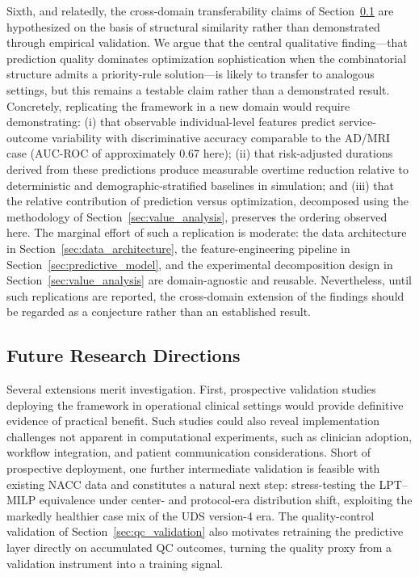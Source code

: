 \documentclass[11pt,a4paper]{article}
\newcommand{\rev}[1]{{\color{red}#1}}
\begin{document}
Sixth, and relatedly, the cross-domain transferability claims of Section~\ref{sec:future} are hypothesized on the basis of structural similarity rather than demonstrated through empirical validation. We argue that the central qualitative finding---that prediction quality dominates optimization sophistication when the combinatorial structure admits a priority-rule solution---is likely to transfer to analogous settings, but this remains a testable claim rather than a demonstrated result. Concretely, replicating the framework in a new domain would require demonstrating: (i) that observable individual-level features predict service-outcome variability with discriminative accuracy comparable to the AD/MRI case (AUC-ROC of approximately 0.67 here); (ii) that risk-adjusted durations derived from these predictions produce measurable overtime reduction relative to deterministic and demographic-stratified baselines in simulation; and (iii) that the relative contribution of prediction versus optimization, decomposed using the methodology of Section~\ref{sec:value_analysis}, preserves the ordering observed here. The marginal effort of such a replication is moderate: the data architecture in Section~\ref{sec:data_architecture}, the feature-engineering pipeline in Section~\ref{sec:predictive_model}, and the experimental decomposition design in Section~\ref{sec:value_analysis} are domain-agnostic and reusable. Nevertheless, until such replications are reported, the cross-domain extension of the findings should be regarded as a conjecture rather than an established result.


\subsection{Future Research Directions}
\label{sec:future}

Several extensions merit investigation. First, prospective validation studies deploying the framework in operational clinical settings would provide definitive evidence of practical benefit. Such studies could also reveal implementation challenges not apparent in computational experiments, such as clinician adoption, workflow integration, and patient communication considerations. \rev{Short of prospective deployment, one further intermediate validation is feasible with existing NACC data and constitutes a natural next step: stress-testing the LPT--MILP equivalence under center- and protocol-era distribution shift, exploiting the markedly healthier case mix of the UDS version-4 era. The quality-control validation of Section~\ref{sec:qc_validation} also motivates retraining the predictive layer directly on accumulated QC outcomes, turning the quality proxy from a validation instrument into a training signal.}
\end{document}
